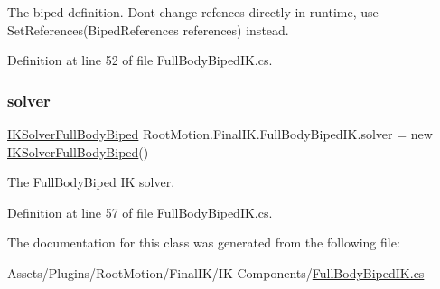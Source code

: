 The biped definition. Don\textquotesingle{}t change refences directly in runtime, use Set\+References(\+Biped\+References references) instead. 



Definition at line 52 of file Full\+Body\+Biped\+I\+K.\+cs.

\mbox{\label{class_root_motion_1_1_final_i_k_1_1_full_body_biped_i_k_ae1ba56ebef8d8312da5a610a90472823}} 
\subsubsection{\texorpdfstring{solver}{solver}}
{\footnotesize\ttfamily \mbox{\hyperlink{class_root_motion_1_1_final_i_k_1_1_i_k_solver_full_body_biped}{I\+K\+Solver\+Full\+Body\+Biped}} Root\+Motion.\+Final\+I\+K.\+Full\+Body\+Biped\+I\+K.\+solver = new \mbox{\hyperlink{class_root_motion_1_1_final_i_k_1_1_i_k_solver_full_body_biped}{I\+K\+Solver\+Full\+Body\+Biped}}()}



The Full\+Body\+Biped IK solver. 



Definition at line 57 of file Full\+Body\+Biped\+I\+K.\+cs.



The documentation for this class was generated from the following file\+:\begin{DoxyCompactItemize}
\item 
Assets/\+Plugins/\+Root\+Motion/\+Final\+I\+K/\+I\+K Components/\mbox{\hyperlink{_full_body_biped_i_k_8cs}{Full\+Body\+Biped\+I\+K.\+cs}}\end{DoxyCompactItemize}
